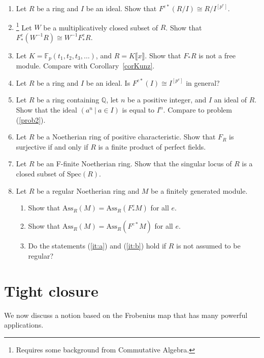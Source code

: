 \documentclass[12pt]{amsart}
\theoremstyle{definition}
\numberwithin{equation}{theorem}
\def\FF{\mathbb{F}}
\def\QQ{\mathbb{Q}}
\begin{document}
\begin{enumerate}
\begin{samepage}
\begin{enumerate}
\end{enumerate}
\end{samepage}
\item Let $R$ be a ring and $I$ be an ideal. Show that $F^{e*}(R/I) \cong R/I^{[p^e]}$.
\item \footnote[2]{Requires some background from Commutative Algebra.} Let $W$ be a multiplicatively closed subset of $R$. Show that $F^e_* (W^{-1}R) \cong W^{-1} F^e_*R$. 
\item Let $K = \FF_p(t_1,t_2,t_3,\dots)$, and $R= K\llbracket x\rrbracket$. Show that $F_*R$ is not a free module. Compare with Corollary~\ref{corKunz}.
\item Let $R$ be a ring and $I$ be an ideal. Is $F^{e*}(I) \cong I^{[p^e]}$ in general?
\item Let $R$ be a ring containing $\QQ$, let $n$ be a positive integer, and $I$ an ideal of $R$. Show that the ideal $( a^n \ | \ a\in I)$ is equal to $I^n$. Compare to problem (\ref{prob2}).
\item\footnotemark[2] Let $R$ be a Noetherian ring of positive characteristic. Show that $F_R$ is surjective if and only if $R$ is a finite product of perfect fields.
\item\footnotemark[2] Let $R$ be an F-finite Noetherian ring. Show that the singular locus of $R$ is a closed subset of $\mathrm{Spec}(R)$.
\item\footnotemark[2] Let $R$ be a regular Noetherian ring and $M$ be a finitely generated module.
\begin{enumerate}
\item\label{it:a} Show that $\mathrm{Ass}_R(M) = \mathrm{Ass}_R(F^e_* M)$ for all $e$.
\item\label{it:b} Show that $\mathrm{Ass}_R(M) = \mathrm{Ass}_R(F^{e*} M)$ for all $e$.
\item Do the statements (\ref{it:a}) and (\ref{it:b}) hold if $R$ is not assumed to be regular?
\end{enumerate}
\end{enumerate}


\newpage

\section{Tight closure}

We now discuss a notion based on the Frobenius map that has many powerful applications.
\end{document}
